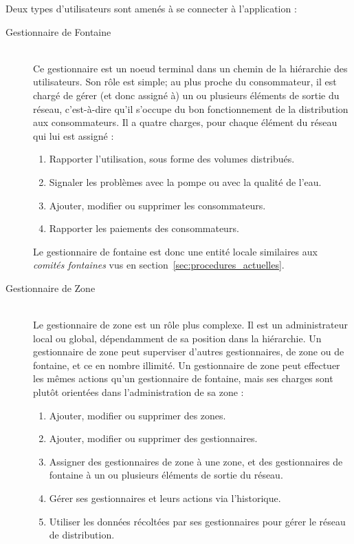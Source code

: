\documentclass{EPL-master-thesis-covers-FR}
\begin{document}
				Deux types d'utilisateurs sont amenés à se connecter à l'application :
				\begin{description}
					\item[Gestionnaire de Fontaine] \hfill \\
						Ce gestionnaire est un noeud terminal dans un chemin de la hiérarchie des utilisateurs. Son rôle est simple; au plus proche du consommateur, il est chargé de gérer (et donc assigné à) un ou plusieurs éléments de sortie du réseau, c'est-à-dire qu'il s'occupe du bon fonctionnement de la distribution aux consommateurs. Il a quatre charges, pour chaque élément du réseau qui lui est assigné :
							\begin{enumerate}
								\item Rapporter l'utilisation, sous forme des volumes distribués.
								\item Signaler les problèmes avec la pompe ou avec la qualité de l'eau.
								\item Ajouter, modifier ou supprimer les consommateurs.
								\item Rapporter les paiements des consommateurs.
							\end{enumerate}
						Le gestionnaire de fontaine est donc une entité locale similaires aux \emph{comités fontaines} vus en section~\ref{sec:procedures_actuelles}.
					\item[Gestionnaire de Zone] \hfill \\
						Le gestionnaire de zone est un rôle plus complexe. Il est un administrateur local ou global, dépendamment de sa position dans la hiérarchie. Un gestionnaire de zone peut superviser d'autres gestionnaires, de zone ou de fontaine, et ce en nombre illimité. Un gestionnaire de zone peut effectuer les mêmes actions qu'un gestionnaire de fontaine, mais ses charges sont plutôt orientées dans l'administration  de sa zone :
							\begin{enumerate}
								\item Ajouter, modifier ou supprimer des zones.
								\item Ajouter, modifier ou supprimer des gestionnaires.
								\item Assigner des gestionnaires de zone à une zone, et des gestionnaires de fontaine à un ou plusieurs éléments de sortie du réseau.
								\item Gérer ses gestionnaires et leurs actions via l'historique.
								\item Utiliser les données récoltées par ses gestionnaires pour gérer le réseau de distribution.
							\end{enumerate}
				\end{description}
\end{document}
